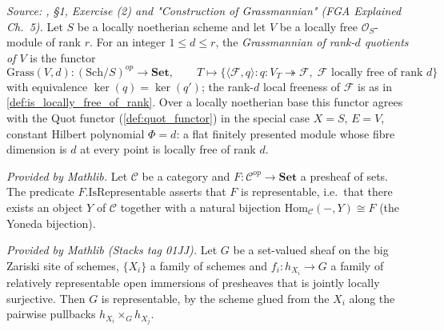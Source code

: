 \begin{definition}
  \textit{Source: \cite{nitsure-hilbert-quot}, \S 1, Exercise (2) and "Construction of
  Grassmannian" (FGA Explained Ch.~5).}
  Let \(S\) be a locally noetherian scheme and let \(V\) be a locally free
  \(\mathcal{O}_S\)-module of rank \(r\). For an integer \(1 \le d \le r\), the
  \emph{Grassmannian of rank-\(d\) quotients of \(V\)} is the functor
  \[
    \mathrm{Grass}(V, d) : (\mathrm{Sch}/S)^{op} \longrightarrow \mathbf{Set},
    \qquad
    T \longmapsto \{ \langle \mathcal{F}, q\rangle :
    q : V_T \twoheadrightarrow \mathcal{F},\; \mathcal{F}
    \text{ locally free of rank } d \}
  \]
  with equivalence \(\ker(q) = \ker(q')\); the rank-\(d\) local freeness of
  \(\mathcal{F}\) is as in \cref{def:is_locally_free_of_rank}. Over a locally
  noetherian base this functor agrees with the Quot functor
  (\cref{def:quot_functor}) in the special case \(X = S\), \(E = V\), constant
  Hilbert polynomial \(\Phi = d\): a flat finitely presented module whose fibre
  dimension is \(d\) at every point is locally free of rank \(d\).
\end{definition}

\begin{lemma}
  \label{lem:functor_is_representable_mathlib}
  \mathlibok
  \textit{Provided by Mathlib.}
  Let \(\mathcal{C}\) be a category and \(F : \mathcal{C}^{op} \to \mathbf{Set}\)
  a presheaf of sets. The predicate \(F.\mathrm{IsRepresentable}\) asserts that
  \(F\) is representable, i.e.\ that there exists an object \(Y\) of
  \(\mathcal{C}\) together with a natural bijection
  \(\mathrm{Hom}_{\mathcal{C}}(-, Y) \cong F\) (the Yoneda bijection).
\end{lemma}

\begin{lemma}
  \label{lem:local_representability_mathlib}
  \mathlibok
  \textit{Provided by Mathlib (Stacks tag 01JJ).}
  Let \(G\) be a set-valued sheaf on the big Zariski site of schemes,
  \(\{X_i\}\) a family of schemes and \(f_i : h_{X_i} \to G\) a family of
  relatively representable open immersions of presheaves that is jointly
  locally surjective.  Then \(G\) is representable, by the scheme glued from
  the \(X_i\) along the pairwise pullbacks \(h_{X_i} \times_G h_{X_j}\).
\end{lemma}

